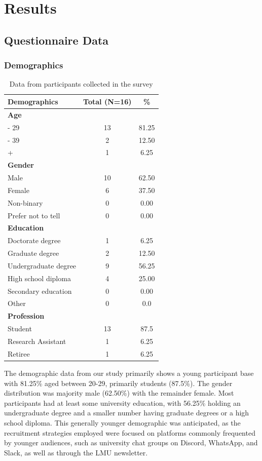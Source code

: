 \documentclass[
  a4paper,  %
  twoside,  %
  bibliography=totoc,
  headsepline,
  cleardoublepage=empty,
  parskip=half,
  draft=false
]{scrbook}
\begin{document}
\chapter{Results}
\label{results}

\section{Questionnaire Data}
\subsection{Demographics}
\begin{table}[ht]
\centering
\begin{tabularx}{\textwidth}{Xcc}
\toprule
\textbf{Demographics} & \textbf{Total (N=16)} & \textbf{\%} \\
\midrule
\textbf{Age} \\
\quad 20 - 29 & 13 & 81.25 \\
\quad 30 - 39 & 2 & 12.50 \\
\quad 40+ & 1 & 6.25 \\
\midrule
\textbf{Gender} \\
\quad Male & 10 & 62.50 \\
\quad Female & 6 & 37.50 \\
\quad Non-binary & 0 & 0.00 \\
\quad Prefer not to tell & 0 & 0.00 \\
\midrule
\textbf{Education} \\
\quad Doctorate degree & 1 & 6.25 \\
\quad Graduate degree & 2 & 12.50 \\
\quad Undergraduate degree & 9 & 56.25 \\
\quad High school diploma & 4 & 25.00 \\
\quad Secondary education & 0 & 0.00 \\
\quad Other & 0 & 0.0 \\
\midrule
\textbf{Profession} \\
\quad Student & 13 & 87.5 \\
\quad Research Assistant & 1 & 6.25 \\
\quad Retiree & 1 & 6.25 \\
\bottomrule
\end{tabularx}
\caption{Data from participants collected in the survey}
\end{table}

The demographic data from our study primarily shows a young participant base with 81.25\% aged between 20-29, primarily students (87.5\%). The gender distribution was majority male (62.50\%) with the remainder female. Most participants had at least some university education, with 56.25\% holding an undergraduate degree and a smaller number having graduate degrees or a high school diploma. This generally younger demographic was anticipated, as the recruitment strategies employed were focused on platforms commonly frequented by younger audiences, such as university chat groups on Discord, WhatsApp, and Slack, as well as through the LMU newsletter.
\end{document}
